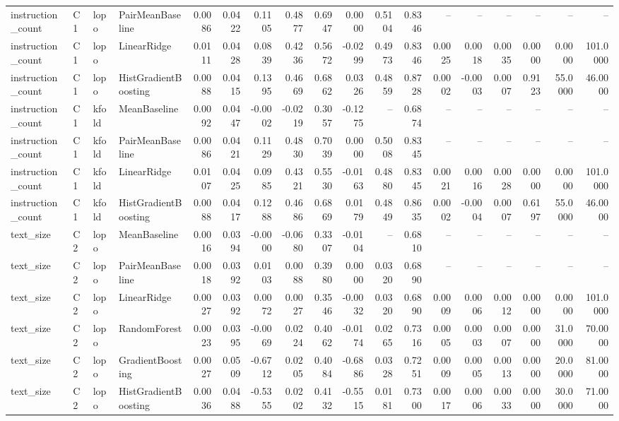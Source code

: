 \begin{table}[t]
\begin{tabular}{llllrrrrrrrrrrrrrr}
instruction\_count & C1 & lopo & PairMeanBaseline & 0.0086 & 0.0422 & 0.1105 & 0.4877 & 0.6947 & 0.0000 & 0.5104 & 0.8346 & -- & -- & -- & -- & -- & -- \\
instruction\_count & C1 & lopo & LinearRidge & 0.0111 & 0.0428 & 0.0839 & 0.4236 & 0.5672 & -0.0299 & 0.4973 & 0.8346 & 0.0025 & 0.0018 & 0.0035 & 0.0000 & 0.0000 & 101.0000 \\
instruction\_count & C1 & lopo & HistGradientBoosting & 0.0088 & 0.0415 & 0.1395 & 0.4669 & 0.6862 & 0.0326 & 0.4859 & 0.8728 & 0.0002 & -0.0003 & 0.0007 & 0.9123 & 55.0000 & 46.0000 \\
instruction\_count & C1 & kfold & MeanBaseline & 0.0092 & 0.0447 & -0.0002 & -0.0219 & 0.3057 & -0.1275 & -- & 0.6874 & -- & -- & -- & -- & -- & -- \\
instruction\_count & C1 & kfold & PairMeanBaseline & 0.0086 & 0.0421 & 0.1129 & 0.4830 & 0.7039 & 0.0000 & 0.5008 & 0.8345 & -- & -- & -- & -- & -- & -- \\
instruction\_count & C1 & kfold & LinearRidge & 0.0107 & 0.0425 & 0.0985 & 0.4321 & 0.5530 & -0.0163 & 0.4880 & 0.8345 & 0.0021 & 0.0016 & 0.0028 & 0.0000 & 0.0000 & 101.0000 \\
instruction\_count & C1 & kfold & HistGradientBoosting & 0.0088 & 0.0417 & 0.1288 & 0.4686 & 0.6869 & 0.0179 & 0.4849 & 0.8635 & 0.0002 & -0.0004 & 0.0007 & 0.6197 & 55.0000 & 46.0000 \\
text\_size & C2 & lopo & MeanBaseline & 0.0016 & 0.0394 & -0.0000 & -0.0680 & 0.3307 & -0.0104 & -- & 0.6810 & -- & -- & -- & -- & -- & -- \\
text\_size & C2 & lopo & PairMeanBaseline & 0.0018 & 0.0392 & 0.0103 & 0.0088 & 0.3980 & 0.0000 & 0.0320 & 0.6890 & -- & -- & -- & -- & -- & -- \\
text\_size & C2 & lopo & LinearRidge & 0.0027 & 0.0392 & 0.0072 & 0.0027 & 0.3546 & -0.0032 & 0.0320 & 0.6890 & 0.0009 & 0.0006 & 0.0012 & 0.0000 & 0.0000 & 101.0000 \\
text\_size & C2 & lopo & RandomForest & 0.0023 & 0.0395 & -0.0069 & 0.0224 & 0.4062 & -0.0174 & 0.0265 & 0.7316 & 0.0005 & 0.0003 & 0.0007 & 0.0000 & 31.0000 & 70.0000 \\
text\_size & C2 & lopo & GradientBoosting & 0.0027 & 0.0509 & -0.6712 & 0.0205 & 0.4084 & -0.6886 & 0.0328 & 0.7251 & 0.0009 & 0.0005 & 0.0013 & 0.0000 & 20.0000 & 81.0000 \\
text\_size & C2 & lopo & HistGradientBoosting & 0.0036 & 0.0488 & -0.5355 & 0.0202 & 0.4132 & -0.5515 & 0.0181 & 0.7300 & 0.0017 & 0.0006 & 0.0033 & 0.0000 & 30.0000 & 71.0000 \\

\end{tabular}
\end{table}
